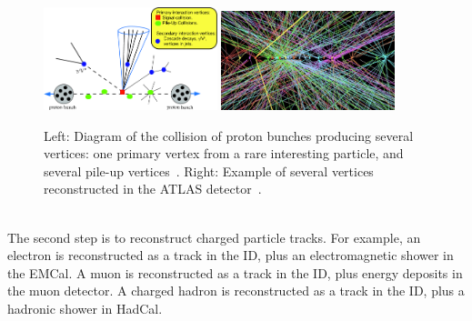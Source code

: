 \begin{figure}[!htb]
  \centering
  \includegraphics[width=0.45\textwidth]{plots/Vertices.png} 
  \includegraphics[width=0.45\textwidth]{plots/Vertices2.png} 
  \caption{Left: Diagram of the collision of proton bunches producing several vertices: one primary vertex from a rare interesting particle, and several pile-up vertices~\cite{ATLASVertices}. Right: Example of several vertices reconstructed in the ATLAS detector~\cite{TrackMLPPTBefore}.}
  \label{fig:Vertices}
\end{figure}

\ \\The second step is to reconstruct charged particle tracks. For example, an electron is reconstructed as a track in the ID, plus an electromagnetic shower in the EMCal. A muon is reconstructed as a track in the ID, plus energy deposits in the muon detector. A charged hadron is reconstructed as a track in the ID, plus a hadronic shower in HadCal. 



